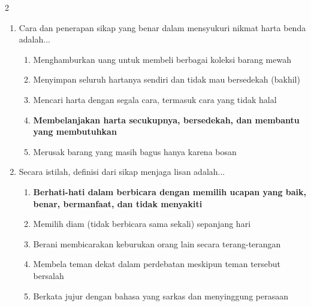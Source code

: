 \documentclass[10pt,a4paper]{article}
\begin{document}
\begin{multicols}{2}
\begin{enumerate}
    \item Cara dan penerapan sikap yang benar dalam mensyukuri nikmat harta benda adalah...
    \begin{enumerate}
      \item Menghamburkan uang untuk membeli berbagai koleksi barang mewah
      \item Menyimpan seluruh hartanya sendiri dan tidak mau bersedekah (bakhil)
      \item Mencari harta dengan segala cara, termasuk cara yang tidak halal
      \item \textbf{Membelanjakan harta secukupnya, bersedekah, dan membantu yang membutuhkan}
      \item Merusak barang yang masih bagus hanya karena bosan
    \end{enumerate}

    \item Secara istilah, definisi dari sikap menjaga lisan adalah...
    \begin{enumerate}
      \item \textbf{Berhati-hati dalam berbicara dengan memilih ucapan yang baik, benar, bermanfaat, dan tidak menyakiti}
      \item Memilih diam (tidak berbicara sama sekali) sepanjang hari
      \item Berani membicarakan keburukan orang lain secara terang-terangan
      \item Membela teman dekat dalam perdebatan meskipun teman tersebut bersalah
      \item Berkata jujur dengan bahasa yang sarkas dan menyinggung perasaan
    \end{enumerate}
  \end{enumerate}
\end{multicols}
\end{document}
